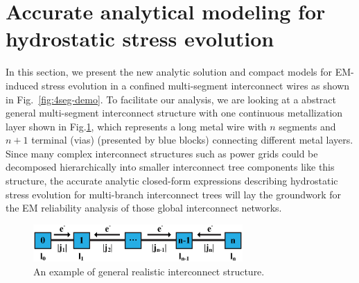 \section{Accurate analytical modeling for hydrostatic stress evolution}
\label{sec:multi_segment}

In this section, we present the new analytic solution and compact
models for EM-induced stress evolution in a confined multi-segment
interconnect wires as shown in Fig.~\ref{fig:4seg-demo}. To facilitate
our analysis, we are looking at a abstract general multi-segment
interconnect structure with one continuous metallization layer shown in
Fig.\ref{fig:interconnect_tree}, which represents a long metal wire
with $n$ segments and $n+1$ terminal (vias) (presented by blue blocks)
connecting different metal layers.  Since many complex interconnect
structures such as power grids could be decomposed hierarchically into
smaller interconnect tree components like this structure, the accurate
analytic closed-form expressions describing hydrostatic stress
evolution for multi-branch interconnect trees will lay the groundwork
for the EM reliability analysis of those global interconnect networks.

\label{sec:analytical_stress}
\begin{figure}[ht] \centering
\includegraphics[width=80mm]{Sn.eps}
\caption{An example of general realistic interconnect structure.}
  \label{fig:interconnect_tree}
  \vspace{-0.12in}
\end{figure}

